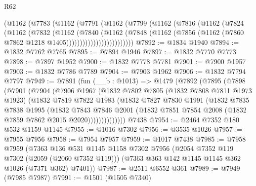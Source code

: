 \begin{lexlean}{R62}
\begin{coremodule}
              (@1162
                (@7783
                  (@1162
                    (@7791
                      (@1162
                        (@7799
                          (@1162
                            (@7816
                              (@1162
                                (@7824
                                  (@1162
                                    (@7832
                                      (@1162
                                        (@7840
                                          (@1162
                                            (@7848
                                              (@1162
                                                (@7856
                                                  (@1162
                                                    (@7860
                                                      @7862
                                                      @1218
                                                      @1405)))))))))))))))))))))))))
@7892 := @1834 @1940
@7894 := @1832 @7762 @7765
@7895 := @7894 @1946
@7897 := @1832 @7770 @7773
@7898 := @7897 @1952
@7900 := @1832 @7778 @7781
@7901 := @7900 @1957
@7903 := @1832 @7786 @7789
@7904 := @7903 @1962
@7906 := @1832 @7794 @7797
@7949 := @7891
    (fun (__b : @1013) =>
    @1479
      (@7892
        (@7895
          (@7898
            (@7901
              (@7904
                (@7906
                  @1967
                  (@1832
                    @7802
                    @7805
                    (@1832 @7808 @7811 @1973 @1923)
                    (@1832
                      @7819
                      @7822
                      @1983
                      (@1832
                        @7827
                        @7830
                        @1991
                        (@1832
                          @7835
                          @7838
                          @1995
                          (@1832
                            @7843
                            @7846
                            @2001
                            (@1832 @7851 @7854 @2008 (@1832 @7859 @7862 @2015 @2020))))))))))))))
    @7438
@7954 := @2464 @7352 @180 @532 @1159 @1145
@7955 := @1016 @7302
@7956 := @3535 @1026
@7957 := @7955 @7956
@7958 := @7954 @7957
@7959 := @1017 @7438
@7985 := @7958
    @7959
    (@7363
      @136
      @531
      @1145
      @1158
      @7302
      @7956
      (@2054 @7352 @119 @7302 (@2059 (@2060 @7352 @119)))
      (@7363 @363 @142 @1145 @1145 @362 @1026 (@7371 @362) @7401))
@7987 := @2511 @6552 @361
@7989 := @7949 (@7985 @7987)
@7991 := @1501 (@1505 @7340)

\end{coremodule}
\end{lexlean}
